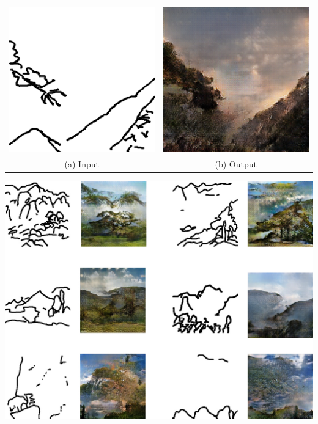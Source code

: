 \documentclass[a4paper, 12pt]{report}
\begin{document}
\begin{center}
  \centering
  \begin{tabular}{cc}
    \includegraphics[height=0.2\textheight]{images/canny-input.png}&
    \includegraphics[height=0.2\textheight]{images/canny-output.png}\\
    (a) Input &(b) Output
  \end{tabular}
\end{center}

\vspace*{\baselineskip}

\begin{center}
  \centering
    \includegraphics[width=0.9\linewidth]{images/canny-photos.jpg}
\end{center}
\end{document}
